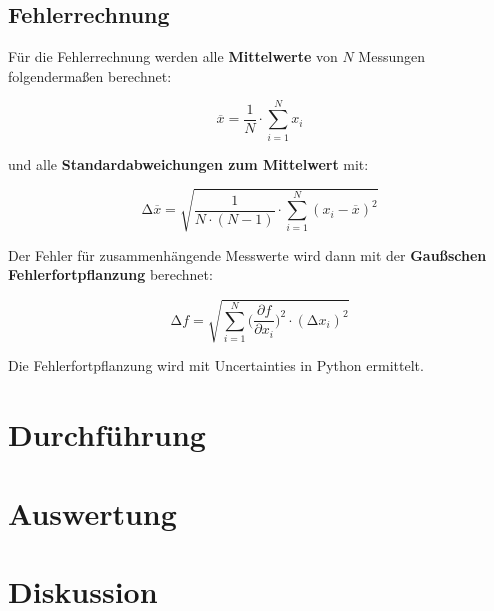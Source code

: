 \subsection{Fehlerrechnung}
Für die Fehlerrechnung werden alle \textbf{Mittelwerte} von $N$ Messungen folgendermaßen berechnet:

\begin{equation}
    \overline{x} = \frac{1}{N} \cdot \sum_{i=1}^N x_i
    \label{eqn:Mittelwert}
\end{equation}

und alle \textbf{Standardabweichungen zum Mittelwert} mit:

\begin{equation}
    \increment\overline{x} = \sqrt{\frac{1}{N\cdot(N-1)}\cdot\sum_{i=1}^N (x_i-\overline{x})^2}
    \label{eqn:St_Mittelwert}
\end{equation}

Der Fehler für zusammenhängende Messwerte wird dann mit der \textbf{Gaußschen Fehlerfortpflanzung} berechnet:

\begin{equation}
    \increment{f} = \sqrt{ \sum_{i = 1}^{N}  \biggl(\frac{\partial{f}}{\partial{x_i}}\biggr)^2\cdot(\increment{x_i})^2}
    \label{eqn:Gauss}
\end{equation}

Die Fehlerfortpflanzung wird mit Uncertainties in Python \cite{uncertainties} ermittelt.


\section{Durchführung}



\section{Auswertung}



\section{Diskussion}


\newpage
\printbibliography

